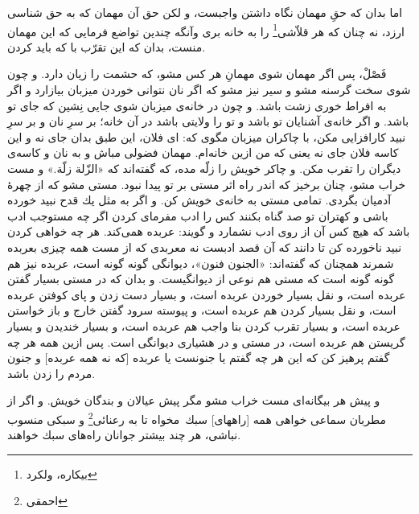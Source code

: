 اما بدان كه حقِ مهمان نگاه داشتن واجبست، و لكن حق آن مهمان كه به حق شناسى ارزد، نه چنان كه هر قلاّشى\footnote{بیکاره، ولکرد} را به خانه برى وآنگه چندين تواضع فرمايى كه اين مهمان منست، بدان كه اين تقرّب با كه بايد كردن.

فَصْلْ، پس اگر مهمان شوى مهمانِ هر كس مشو، كه حشمت را زيان دارد. و چون شوى سخت گرسنه مشو و سير نيز مشو كه اگر نان نتوانى خوردن ميزبان بيازارد و اگر به افراط خورى زشت باشد. و چون در خانه‌ی ميزبان شوى جايى نِشين كه جاى تو باشد. و اگر خانه‌ی آشنايان تو باشد و تو را ولايتى باشد در آن خانه؛ بر سرِ نان و بر سرِ نبيد كارافزايى مكن، با چاكران ميزبان مگوى كه: اى فلان، اين طبق بدان جاى نه و اين كاسه فلان جاى نه يعنى كه من ازين خانه‌ام. مهمان فضولى مباش و به نان و كاسه‌ی ديگران را تقرب مكن. و چاكر خويش را زلّه مده، كه گفته‌اند كه «الزّلة زلّة.» و مست خراب مشو، چنان برخيز كه اندر راه اثر مستى بر تو پيدا نبود. مستى مشو كه از چهرۀ آدميان بگردى. تمامى مستى به خانه‌ی خويش كن. و اگر به مثل يك قدح نبيد خورده باشى و كهتران تو صد گناه بكنند كس را ادب مفرماى كردن اگر چه مستوجب ادب باشد كه هيچ كس آن از روى ادب نشمارد و گويند: عربده همى‌كند. هر چه خواهى كردن نبيد ناخورده كن تا دانند كه آن قصد ادبست نه معربدى كه از مست همه چيزى بعربده شمرند همچنان كه گفته‌اند: «الجنون فنون»، ديوانگى گونه گونه است، عربده نيز هم گونه گونه است كه مستى هم نوعى از ديوانگيست. و بدان كه در مستى بسيار گفتن عربده است، و نقل بسيار خوردن عربده است، و بسيار دست زدن و پاى كوفتن عربده است، و نقل بسيار كردن هم عربده است، و پيوسته سرود گفتن خارج و باز خواستن عربده است، و بسيار تقرب كردن بنا واجب هم عربده است، و بسيار خنديدن و بسيار گريستن هم عربده است، در مستى و در هشيارى ديوانگى است. پس ازين همه هر چه گفتم پرهيز كن كه اين هر چه گفتم يا جنونست يا عربده [كه نه همه عربده] و جنون مردم را زدن باشد.

و پيش هر بيگانه‌اى مست خراب مشو مگر پيش عيالان و بندگان خويش. و اگر از مطربان سماعى خواهى همه [راههاى] سبك\ مخواه تا به رعنائى\footnote{احمقی} و سبكى منسوب نباشى، هر چند بيشتر جوانان راه‌هاى سبك خواهند.



\newpage








































